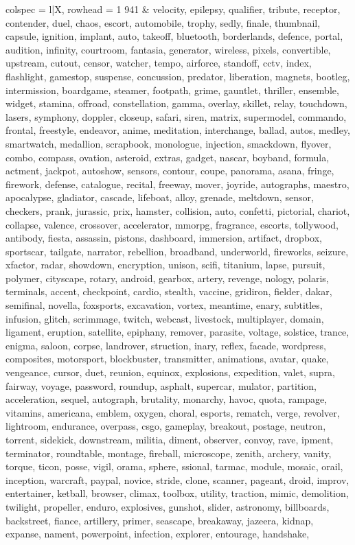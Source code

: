 \begin{tblr}[
  long,
  caption = {Examples from SNLI.},
  entry = {Short Caption},
  label = {tblr:test},
]{
colspec = {l|X},
rowhead = 1}
941 & velocity, epilepsy, qualifier, tribute, receptor, contender, duel, chaos, escort, automobile, trophy, sedly, finale, thumbnail, capsule, ignition, implant, auto, takeoff, bluetooth, borderlands, defence, portal, audition, infinity, courtroom, fantasia, generator, wireless, pixels, convertible, upstream, cutout, censor, watcher, tempo, airforce, standoff, cctv, index, flashlight, gamestop, suspense, concussion, predator, liberation, magnets, bootleg, intermission, boardgame, steamer, footpath, grime, gauntlet, thriller, ensemble, widget, stamina, offroad, constellation, gamma, overlay, skillet, relay, touchdown, lasers, symphony, doppler, closeup, safari, siren, matrix, supermodel, commando, frontal, freestyle, endeavor, anime, meditation, interchange, ballad, autos, medley, smartwatch, medallion, scrapbook, monologue, injection, smackdown, flyover, combo, compass, ovation, asteroid, extras, gadget, nascar, boyband, formula, actment, jackpot, autoshow, sensors, contour, coupe, panorama, asana, fringe, firework, defense, catalogue, recital, freeway, mover, joyride, autographs, maestro, apocalypse, gladiator, cascade, lifeboat, alloy, grenade, meltdown, sensor, checkers, prank, jurassic, prix, hamster, collision, auto, confetti, pictorial, chariot, collapse, valence, crossover, accelerator, mmorpg, fragrance, escorts, tollywood, antibody, fiesta, assassin, pistons, dashboard, immersion, artifact, dropbox, sportscar, tailgate, narrator, rebellion, broadband, underworld, fireworks, seizure, xfactor, radar, showdown, encryption, unison, scifi, titanium, lapse, pursuit, polymer, cityscape, rotary, android, gearbox, artery, revenge, nology, polaris, terminals, accent, checkpoint, cardio, stealth, vaccine, gridiron, fielder, dakar, semifinal, novella, foxsports, excavation, vortex, meantime, enary, subtitles, infusion, glitch, scrimmage, twitch, webcast, livestock, multiplayer, domain, ligament, eruption, satellite, epiphany, remover, parasite, voltage, solstice, trance, enigma, saloon, corpse, landrover, struction, inary, reflex, facade, wordpress, composites, motorsport, blockbuster, transmitter, animations, avatar, quake, vengeance, cursor, duet, reunion, equinox, explosions, expedition, valet, supra, fairway, voyage, password, roundup, asphalt, supercar, mulator, partition, acceleration, sequel, autograph, brutality, monarchy, havoc, quota, rampage, vitamins, americana, emblem, oxygen, choral, esports, rematch, verge, revolver, lightroom, endurance, overpass, csgo, gameplay, breakout, postage, neutron, torrent, sidekick, downstream, militia, diment, observer, convoy, rave, ipment, terminator, roundtable, montage, fireball, microscope, zenith, archery, vanity, torque, ticon, posse, vigil, orama, sphere, ssional, tarmac, module, mosaic, orail, inception, warcraft, paypal, novice, stride, clone, scanner, pageant, droid, improv, entertainer, ketball, browser, climax, toolbox, utility, traction, mimic, demolition, twilight, propeller, enduro, explosives, gunshot, slider, astronomy, billboards, backstreet, fiance, artillery, primer, seascape, breakaway, jazeera, kidnap, expanse, nament, powerpoint, infection, explorer, entourage, handshake, 
\end{tblr}
